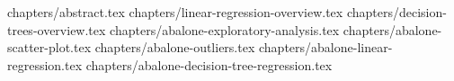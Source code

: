 \documentclass[a4paper,12pt]{article}
\begin{document}
 
 
 

\tableofcontents
\clearpage
{chapters/abstract.tex}
{chapters/linear-regression-overview.tex}
{chapters/decision-trees-overview.tex}
{chapters/abalone-exploratory-analysis.tex}
{chapters/abalone-scatter-plot.tex}
{chapters/abalone-outliers.tex}
{chapters/abalone-linear-regression.tex}
{chapters/abalone-decision-tree-regression.tex}
 


\end{document}

